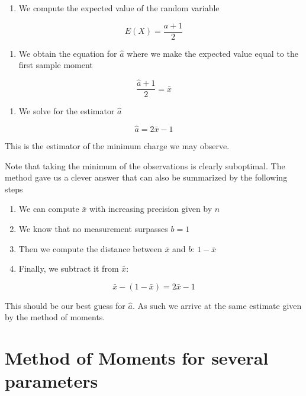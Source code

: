 \documentclass[
]{book}
\providecommand{\tightlist}{%
  \setlength{\itemsep}{0pt}\setlength{\parskip}{0pt}}
\begin{document}
\begin{enumerate}
\def\labelenumi{\arabic{enumi}.}
\tightlist
\item
  We compute the expected value of the random variable
\end{enumerate}

\[E(X)=\frac{a+1}{2}\]

\begin{enumerate}
\def\labelenumi{\arabic{enumi}.}
\setcounter{enumi}{1}
\tightlist
\item
  We obtain the equation for \(\hat{a}\) where we make the expected value equal to the first sample moment
\end{enumerate}

\[\frac{\hat{a}+1}{2}=\bar{x}\]

\begin{enumerate}
\def\labelenumi{\arabic{enumi}.}
\setcounter{enumi}{2}
\tightlist
\item
  We solve for the estimator \(\hat{a}\)
\end{enumerate}

\[\hat{a}=2\bar{x}-1\]

This is the estimator of the minimum charge we may observe.

Note that taking the minimum of the observations is clearly suboptimal. The method gave us a clever answer that can also be summarized by the following steps

\begin{enumerate}
\def\labelenumi{\alph{enumi})}
\tightlist
\item
  We can compute \(\bar{x}\) with increasing precision given by \(n\)
\item
  We know that no measurement surpasses \(b=1\)
\item
  Then we compute the distance between \(\bar{x}\) and \(b\): \(1-\bar{x}\)
\item
  Finally, we subtract it from \(\bar{x}\):
\end{enumerate}

\[\bar{x}-(1-\bar{x})=2\bar{x}-1\]

This should be our best guess for \(\hat{a}\). As such we arrive at the same estimate given by the method of moments.

\hypertarget{method-of-moments-for-several-parameters}{%
\section{Method of Moments for several parameters}\label{method-of-moments-for-several-parameters}}
\end{document}
